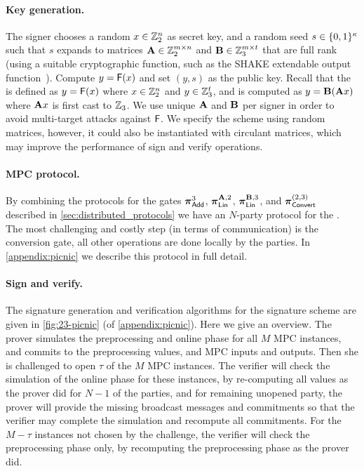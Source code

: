 \paragraph{Key generation.}
The signer chooses a random $x \in \mathbb{Z}_2^n$ as 
secret key, and a random seed $s \in \{0,1\}^{\kappa}$ such that $s$
expands to matrices $\mathbf{A} \in \mathbb{Z}_2^{m\times n}$ and $\mathbf{B}\in \mathbb{Z}_3^{m\times t}$ that are full rank (using a suitable cryptographic
function, such as the SHAKE extendable output function~\cite{sp800-185}).
Compute $y = \mathsf{F}(x)$ and set $(y, s)$ as the public key.
Recall that the \ttOWF is defined as $y = \mathsf{F}(x)$ where $x \in \mathbb{Z}_2^{n}$ and $y\in \mathbb{Z}_3^{t}$, and is computed as $y = \mat{B}(\mat{A}x)$ where $\mat{A}x$ is first cast to $\mathbb{Z}_3$. 
\iffull
We use unique $\mathbf{A}$ and $\mathbf{B}$ per signer in order to avoid multi-target attacks against $\mathsf{F}$.
We specify the scheme using random matrices, however, it could also be instantiated
with circulant matrices, which may improve the performance of sign and verify operations.
\fi

\paragraph{MPC protocol.}
By combining the protocols for the gates 
$\boldsymbol{\pi}_{\textnormal{\textsf{Add}}}^{3}$,
$\prot_{\LMap}^{\mat{A},2}$,
$\prot_{\LMap}^{\mat{B},3}$, and
$\boldsymbol{\pi}_{\textnormal{\textsf{Convert}}}^{(2,3)}$
described in \cref{sec:distributed_protocols} we have an $N$-party protocol for
the \ttOWF. The most challenging and costly step (in terms of communication) is
the conversion gate, all other operations are done locally by the parties.  In
\cref{appendix:picnic} we describe this protocol in full detail.  

\paragraph{Sign and verify.} 
The signature generation and verification algorithms for the
\ttOWF  signature scheme are given in \cref{fig:23-picnic} (of \cref{appendix:picnic}).
Here we give an overview. The
prover simulates the preprocessing and online phase for all $M$ MPC instances, and commits
to the preprocessing values, and MPC inputs and outputs.
Then she is challenged to open $\tau$ of the $M$ MPC instances.
The verifier will check the simulation of the online phase for these instances,
by re-computing all values as the prover did for $N-1$ of the parties, and for
remaining unopened party, the prover will provide the missing broadcast messages
and commitments so that the verifier may complete the simulation and recompute all
commitments. 
For the $M-\tau$ instances not chosen by the challenge, the verifier will check
the preprocessing phase only, by recomputing the preprocessing phase as the prover did. 

